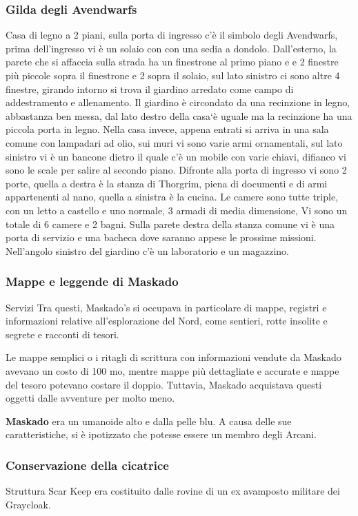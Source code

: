 \documentclass{article}
\begin{document}
\subsubsection{Gilda degli Avendwarfs}
Casa di legno a 2 piani, sulla porta di ingresso c'è il simbolo degli Avendwarfs, prima dell'ingresso vi è un solaio con con una sedia a dondolo. Dall'esterno, la parete che si affaccia sulla strada ha un finestrone al primo piano e e 2 finestre più piccole sopra il finestrone e 2 sopra il solaio, sul lato sinistro ci sono altre 4 finestre, girando intorno si trova il giardino arredato come campo di addestramento e allenamento. Il giardino è circondato da una recinzione in legno, abbastanza ben messa, dal lato destro della casa`è uguale ma la recinzione ha una piccola porta in legno. Nella casa invece, appena entrati si arriva in una sala comune con lampadari ad olio, sui muri vi sono varie armi ornamentali, sul lato sinistro vi è un bancone dietro il quale c'è un mobile con varie chiavi, difianco vi sono le scale per salire al secondo piano. Difronte alla porta di ingresso vi sono 2 porte, quella a destra è la stanza di Thorgrim, piena di documenti e di armi appartenenti al nano, quella a sinistra è la cucina. Le camere sono tutte triple, con un letto a castello e uno normale, 3 armadi di media dimensione, Vi sono un totale di 6 camere e 2 bagni. Sulla parete destra della stanza comune vi è una porta di servizio e una bacheca dove saranno appese le prossime missioni. Nell'angolo sinistro del giardino c'è un laboratorio e un magazzino. 
\subsubsection{Mappe e leggende di Maskado}
Servizi\newline
Tra questi, Maskado's si occupava in particolare di mappe, registri e informazioni relative all'esplorazione del Nord, come sentieri, rotte insolite e segrete e racconti di tesori.

Le mappe semplici o i ritagli di scrittura con informazioni vendute da Maskado avevano un costo di 100 mo, mentre mappe più dettagliate e accurate e mappe del tesoro potevano costare il doppio. Tuttavia, Maskado acquistava questi oggetti dalle avventure per molto meno.

\textbf{Maskado} era un umanoide alto e dalla pelle blu. A causa delle sue caratteristiche, si è ipotizzato che potesse essere un membro degli Arcani.

\subsubsection{Conservazione della cicatrice}
Struttura
Scar Keep era costituito dalle rovine di un ex avamposto militare dei Graycloak.
\end{document}
